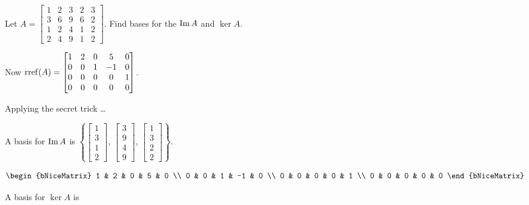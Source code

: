 \documentclass[../main.tex]{subfiles}
\begin{document}
\begin{example}[]
    Let \( A = \begin{bmatrix}
        1 & 2 & 3 & 2 & 3 \\
        3 & 6 & 9 & 6 & 2 \\
        1 & 2 & 4 & 1 & 2 \\
        2 & 4 & 9 & 1 & 2
    \end{bmatrix} \). Find bases for the \( \operatorname{Im} A \) and \( \ker A \).

    Now \( \operatorname{rref}(A) = \begin{bmatrix}
        1 & 2 & 0 & 5 & 0 \\
        0 & 0 & 1 & -1 & 0 \\
        0 & 0 & 0 & 0 & 1 \\
        0 & 0 & 0 & 0 & 0 
    \end{bmatrix} \).
    
    Applying the secret trick \dots

    A basis for \( \operatorname{Im} A \) is
    \( \left\{
        \begin{bmatrix} 1 \\ 3 \\ 1 \\ 2 \end{bmatrix}, \,
        \begin{bmatrix} 3 \\ 9 \\ 4 \\ 9 \end{bmatrix}, \,
        \begin{bmatrix} 1 \\ 3 \\ 2 \\ 2 \end{bmatrix}
    \right\} \).

    \[ \begin{bNiceMatrix}
        1 & 2 & 0 & 5 & 0 \\
        0 & 0 & 1 & -1 & 0 \\
        0 & 0 & 0 & 0 & 1 \\
        0 & 0 & 0 & 0 & 0
    \end{bNiceMatrix} \]

    A basis for \( \ker A \) is
    \( 
     \)
\end{example}
\end{document}
